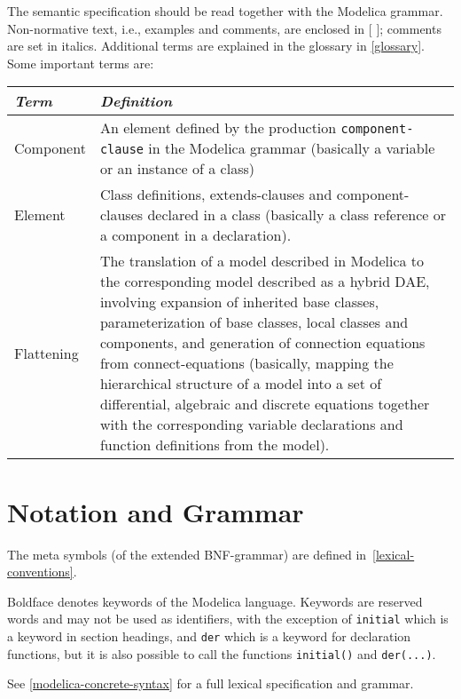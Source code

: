 The semantic specification should be read together with the Modelica
grammar. Non-normative text, i.e., examples and comments, are enclosed
  in {[} {]}; comments are set in italics. Additional terms are explained
in the glossary in \autoref{glossary}. Some important terms are:

\begin{tabular}{|l|p{10cm}|}
\hline
\emph{Term} & \emph{Definition} \\
\hline
Component & An element defined by the production
\lstinline!component-clause! in the Modelica grammar (basically a
variable or an instance of a class)\\
Element & Class definitions, extends-clauses and
component-clauses declared in a class (basically a class
reference or a component in a declaration).\\
Flattening & The translation of a model described in Modelica to the
corresponding model described as a hybrid DAE, involving expansion of
inherited base classes, parameterization of base classes, local classes
and components, and generation of connection equations from
connect-equations (basically, mapping the hierarchical structure of a
model into a set of differential, algebraic and discrete equations
together with the corresponding variable declarations and function
definitions from the model).\\
\hline
\end{tabular}

\section{Notation and Grammar}

The meta symbols (of the extended BNF-grammar) are defined in~\autoref{lexical-conventions}.

Boldface denotes keywords of the Modelica language. Keywords are
reserved words and may not be used as identifiers, with the exception of
\lstinline!initial! which is a keyword in section headings, and \lstinline!der! which is a
keyword for declaration functions, but it is also possible to call the
functions \lstinline!initial()! and \lstinline!der(...)!.

See \autoref{modelica-concrete-syntax} for a full lexical specification and grammar.